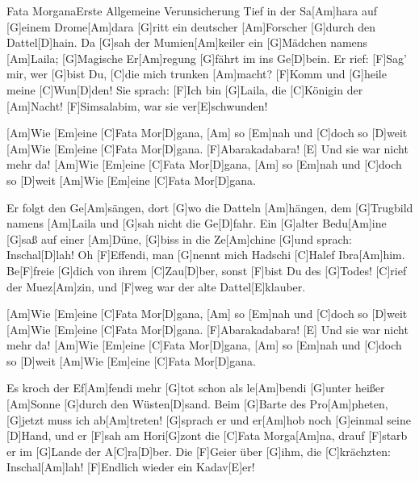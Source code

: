 \documentclass[../main.tex]{subfiles}
\begin{document}
\begin{song}{Fata Morgana}{Erste Allgemeine Verunsicherung}{}
Tief in der Sa[Am]hara auf [G]einem Drome[Am]dara
[G]ritt ein deutscher [Am]Forscher [G]durch den Dattel[D]hain.
Da [G]sah der Mumien[Am]keiler ein [G]Mädchen namens [Am]Laila;
[G]Magische Er[Am]regung [G]fährt im ins Ge[D]bein.
Er rief: \glqq{}[F]Sag' mir, wer [G]bist Du, [C]die mich trunken [Am]macht?
[F]Komm und [G]heile meine [C]Wun[D]den!\grqq{}
Sie sprach: \glqq{}[F]Ich bin [G]Laila, die [C]Königin der [Am]Nacht!\grqq{}
[F]Simsalabim, war sie ver[E]schwunden!

[Am]Wie [Em]eine [C]Fata Mor[D]gana, [Am]{\hh} so [Em]nah und [C]doch so [D]weit
[Am]Wie [Em]eine [C]Fata Mor[D]gana. [F]Abarakadabara! [E]  Und sie war nicht mehr da!
[Am]Wie [Em]eine [C]Fata Mor[D]gana, [Am]{\hh} so [Em]nah und [C]doch so [D]weit
[Am]Wie [Em]eine [C]Fata Mor[D]gana.

Er folgt den Ge[Am]sängen, dort [G]wo die Datteln [Am]hängen,
dem [G]Trugbild namens [Am]Laila und [G]sah nicht die Ge[D]fahr.
Ein [G]alter Bedu[Am]ine [G]saß auf einer [Am]Düne,
[G]biss in die Ze[Am]chine [G]und sprach: \glqq{}Inschal[D]lah!
Oh [F]Effendi, man [G]nennt mich Hadschi [C]Halef Ibra[Am]him.
Be[F]freie [G]dich von ihrem [C]Zau[D]ber,
sonst [F]bist Du des [G]Todes!\grqq{} [C]rief der Muez[Am]zin,
und [F]weg war der alte Dattel[E]klauber.

[Am]Wie [Em]eine [C]Fata Mor[D]gana, [Am]{\hh} so [Em]nah und [C]doch so [D]weit
[Am]Wie [Em]eine [C]Fata Mor[D]gana. [F]Abarakadabara! [E]  Und sie war nicht mehr da!
[Am]Wie [Em]eine [C]Fata Mor[D]gana, [Am]{\hh} so [Em]nah und [C]doch so [D]weit
[Am]Wie [Em]eine [C]Fata Mor[D]gana.

Es kroch der Ef[Am]fendi mehr [G]tot schon als le[Am]bendi
[G]unter heißer [Am]Sonne [G]durch den Wüsten[D]sand.
\glqq{}Beim [G]Barte des Pro[Am]pheten, [G]jetzt muss ich ab[Am]treten!\grqq{}
[G]sprach er und er[Am]hob noch [G]einmal seine [D]Hand,
und er [F]sah am Hori[G]zont die [C]Fata Morga[Am]na,
drauf [F]starb er im [G]Lande der A[C]ra[D]ber.
Die [F]Geier über [G]ihm, die [C]krächzten: \glqq{}Inschal[Am]lah!
[F]Endlich wieder ein Kadav[E]er!\grqq{}

\end{song}
\end{document}

